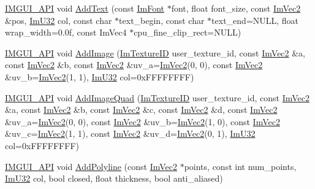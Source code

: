 \begin{DoxyCompactItemize}
\item 
\mbox{\hyperlink{imgui_8h_a43829975e84e45d1149597467a14bbf5}{I\+M\+G\+U\+I\+\_\+\+A\+PI}} void \mbox{\hyperlink{struct_im_draw_list_a0a226cbe9bb1480428e145d8535cda26}{Add\+Text}} (const \mbox{\hyperlink{struct_im_font}{Im\+Font}} $\ast$font, float font\+\_\+size, const \mbox{\hyperlink{struct_im_vec2}{Im\+Vec2}} \&pos, \mbox{\hyperlink{imgui_8h_a118cff4eeb8d00e7d07ce3d6460eed36}{Im\+U32}} col, const char $\ast$text\+\_\+begin, const char $\ast$text\+\_\+end=N\+U\+LL, float wrap\+\_\+width=0.\+0f, const Im\+Vec4 $\ast$cpu\+\_\+fine\+\_\+clip\+\_\+rect=\+N\+U\+L\+L)
\item 
\mbox{\hyperlink{imgui_8h_a43829975e84e45d1149597467a14bbf5}{I\+M\+G\+U\+I\+\_\+\+A\+PI}} void \mbox{\hyperlink{struct_im_draw_list_ac37cd998bf5f40705c7445004a029b66}{Add\+Image}} (\mbox{\hyperlink{imgui_8h_a364f4447ecbc4ca176145ccff9db6286}{Im\+Texture\+ID}} user\+\_\+texture\+\_\+id, const \mbox{\hyperlink{struct_im_vec2}{Im\+Vec2}} \&a, const \mbox{\hyperlink{struct_im_vec2}{Im\+Vec2}} \&b, const \mbox{\hyperlink{struct_im_vec2}{Im\+Vec2}} \&uv\+\_\+a=\mbox{\hyperlink{struct_im_vec2}{Im\+Vec2}}(0, 0), const \mbox{\hyperlink{struct_im_vec2}{Im\+Vec2}} \&uv\+\_\+b=\mbox{\hyperlink{struct_im_vec2}{Im\+Vec2}}(1, 1), \mbox{\hyperlink{imgui_8h_a118cff4eeb8d00e7d07ce3d6460eed36}{Im\+U32}} col=0x\+F\+F\+F\+F\+F\+F\+F\+F)
\item 
\mbox{\hyperlink{imgui_8h_a43829975e84e45d1149597467a14bbf5}{I\+M\+G\+U\+I\+\_\+\+A\+PI}} void \mbox{\hyperlink{struct_im_draw_list_a1cc1f8d4d1812c65c7887b8d5aef31fe}{Add\+Image\+Quad}} (\mbox{\hyperlink{imgui_8h_a364f4447ecbc4ca176145ccff9db6286}{Im\+Texture\+ID}} user\+\_\+texture\+\_\+id, const \mbox{\hyperlink{struct_im_vec2}{Im\+Vec2}} \&a, const \mbox{\hyperlink{struct_im_vec2}{Im\+Vec2}} \&b, const \mbox{\hyperlink{struct_im_vec2}{Im\+Vec2}} \&c, const \mbox{\hyperlink{struct_im_vec2}{Im\+Vec2}} \&d, const \mbox{\hyperlink{struct_im_vec2}{Im\+Vec2}} \&uv\+\_\+a=\mbox{\hyperlink{struct_im_vec2}{Im\+Vec2}}(0, 0), const \mbox{\hyperlink{struct_im_vec2}{Im\+Vec2}} \&uv\+\_\+b=\mbox{\hyperlink{struct_im_vec2}{Im\+Vec2}}(1, 0), const \mbox{\hyperlink{struct_im_vec2}{Im\+Vec2}} \&uv\+\_\+c=\mbox{\hyperlink{struct_im_vec2}{Im\+Vec2}}(1, 1), const \mbox{\hyperlink{struct_im_vec2}{Im\+Vec2}} \&uv\+\_\+d=\mbox{\hyperlink{struct_im_vec2}{Im\+Vec2}}(0, 1), \mbox{\hyperlink{imgui_8h_a118cff4eeb8d00e7d07ce3d6460eed36}{Im\+U32}} col=0x\+F\+F\+F\+F\+F\+F\+F\+F)
\item 
\mbox{\hyperlink{imgui_8h_a43829975e84e45d1149597467a14bbf5}{I\+M\+G\+U\+I\+\_\+\+A\+PI}} void \mbox{\hyperlink{struct_im_draw_list_a3ca939b6e4b35a93611d2d42d7e20434}{Add\+Polyline}} (const \mbox{\hyperlink{struct_im_vec2}{Im\+Vec2}} $\ast$points, const int num\+\_\+points, \mbox{\hyperlink{imgui_8h_a118cff4eeb8d00e7d07ce3d6460eed36}{Im\+U32}} col, bool closed, float thickness, bool anti\+\_\+aliased)

\end{DoxyCompactItemize}
